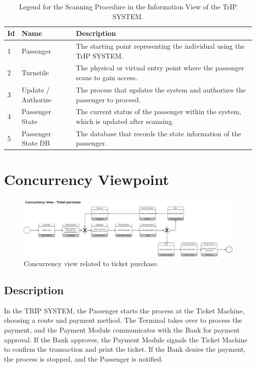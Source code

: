 \begin{table}[H]
    \centering
    \caption{Legend for the Scanning Procedure in the Information View of the TrIP SYSTEM.}
    \label{tab:scanning_procedure_legend}
    \begin{tabular}{@{}llp{10cm}@{}}
    \toprule
    \textbf{Id} & \textbf{Name} & \textbf{Description} \\
    \midrule
    1 & Passenger & The starting point representing the individual using the TrIP SYSTEM. \\
    2 & Turnstile & The physical or virtual entry point where the passenger scans to gain access. \\
    3 & Update / Authorize & The process that updates the system and authorizes the passenger to proceed. \\
    4 & Passenger State & The current status of the passenger within the system, which is updated after scanning. \\
    5 & Passenger State DB & The database that records the state information of the passenger. \\
    \bottomrule
\end{tabular}
\end{table}

\section{Concurrency Viewpoint}

\begin{figure}[H]
    \centering
    \includegraphics[width=\textwidth]{drawings/views_final_version/concurrency_view_1.png}
    \caption{Concurrency view related to ticket purchase.}
    \label{fig:concurrency_view_1}
\end{figure}

\subsection*{Description}
In the TRIP SYSTEM, the Passenger starts the process at the Ticket Machine, choosing a route and payment method. The Terminal takes over to process the payment, and the Payment Module communicates with the Bank for payment approval. If the Bank approves, the Payment Module signals the Ticket Machine to confirm the transaction and print the ticket. If the Bank denies the payment, the process is stopped, and the Passenger is notified.

